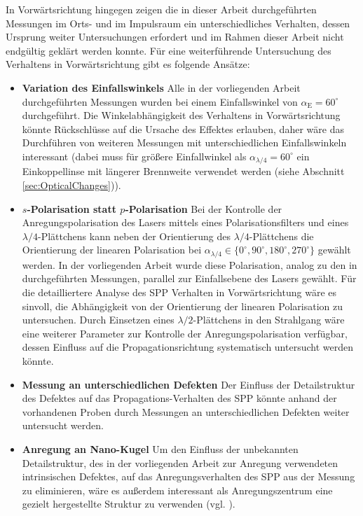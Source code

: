\documentclass[titlepage,  ngerman]{article}
\begin{document}
	In Vorwärtsrichtung hingegen zeigen die in dieser Arbeit durchgeführten Messungen im Orts- und im Impulsraum ein unterschiedliches Verhalten, dessen Ursprung weiter Untersuchungen erfordert und im Rahmen dieser Arbeit nicht endgültig geklärt werden konnte. Für eine weiterführende Untersuchung des Verhaltens in Vorwärtsrichtung gibt es folgende Ansätze:
	\begin{itemize}
		\item \textbf{Variation des Einfallswinkels} Alle in der vorliegenden Arbeit durchgeführten Messungen wurden bei einem Einfallswinkel von $\alpha_{\mathrm{E}} = 60^\circ$ durchgeführt. Die Winkelabhängigkeit des Verhaltens in Vorwärtsrichtung könnte Rückschlüsse auf die Ursache des Effektes erlauben, daher wäre das Durchführen von weiteren Messungen mit unterschiedlichen Einfallswinkeln interessant (dabei muss für größere Einfallwinkel als $\alpha_{\lambda /4} = 60^\circ$ ein Einkoppellinse mit längerer Brennweite verwendet werden (siehe Abschnitt \ref{sec:OpticalChanges})).
		\item \textbf{$s$-Polarisation statt $p$-Polarisation} Bei der Kontrolle der Anregungspolarisation des Lasers mittels eines Polarisationsfilters und eines $\lambda / 4$-Plättchens kann neben der Orientierung  des $\lambda / 4$-Plättchens die Orientierung der linearen Polarisation bei $\alpha_{\lambda /4} \in \{0^\circ, 90^\circ, 180^\circ, 270^\circ\}$ gewählt werden. In der vorliegenden Arbeit wurde diese Polarisation, analog zu den in \cite{RodriguezFortuno.2013} durchgeführten Messungen, parallel zur Einfallsebene des Lasers gewählt. Für die detailliertere Analyse des SPP Verhalten in Vorwärtsrichtung wäre es sinvoll, die Abhängigkeit von der Orientierung der linearen Polarisation zu untersuchen. Durch Einsetzen eines $\lambda /2$-Plättchens in den Strahlgang wäre eine weiterer Parameter zur Kontrolle der Anregungspolarisation verfügbar, dessen Einfluss auf die Propagationsrichtung systematisch untersucht werden könnte.
		\item \textbf{Messung an unterschiedlichen Defekten} Der Einfluss der Detailstruktur des Defektes auf das Propagations-Verhalten des SPP könnte anhand der vorhandenen Proben durch Messungen an unterschiedlichen Defekten weiter untersucht werden.
		\item \textbf{Anregung an Nano-Kugel} Um den Einfluss der unbekannten Detailstruktur, des in der vorliegenden Arbeit zur Anregung verwendeten intrinsischen Defektes, auf das Anregungsverhalten des SPP aus der Messung zu eliminieren, wäre es außerdem interessant als Anregungszentrum eine gezielt hergestellte Struktur zu verwenden (vgl. \cite{OConnor.2014}). 

\end{itemize}
\end{document}
